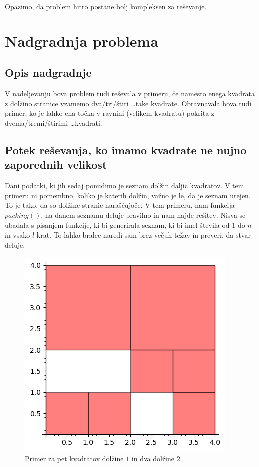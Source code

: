 \documentclass[a4paper, 11pt]{article}
\begin{document}
\noindent Opazimo, da problem hitro postane bolj kompleksen za reševanje.

\section{Nadgradnja problema}
\subsection{Opis nadgradnje}
V nadeljevanju bova problem tudi reševala v primeru, 
če namesto enega kvadrata z dolžino 
stranice vzamemo dva/tri/štiri \dots take kvadrate. 
Obravnavala bova tudi primer, ko je lahko ena točka v ravnini (velikem kvadratu) pokrita z 
dvema/tremi/štirimi \dots  kvadrati.
\subsection{Potek reševanja, ko imamo kvadrate ne nujno zaporednih velikost}
Dani podatki, ki jih sedaj ponudimo je seznam dolžin daljic kvadratov. V tem primeru ni 
pomembno, koliko je katerih dolžin, važno je le, da je seznam urejen. To je tako,
da so dolžine stranic naraščujoče.
V tem primeru, nam funkcija $packing()$, na danem seznamu deluje pravilno in nam najde rešitev.
Nisva se ubadala s pisanjem funkcije, ki bi generirala seznam, ki bi imel števila od 
$1$ do $n$ in vsako $l$-krat. To lahko bralec naredi sam brez večjih težav in preveri, da 
stvar deluje.

\begin{figure}[H]
    \centering
    \includegraphics{Vec_istih_kvadratov.png}
    \caption{Primer za pet kvadratov dolžine $1$ in dva dolžine $2$}
\end{figure}
\end{document}
